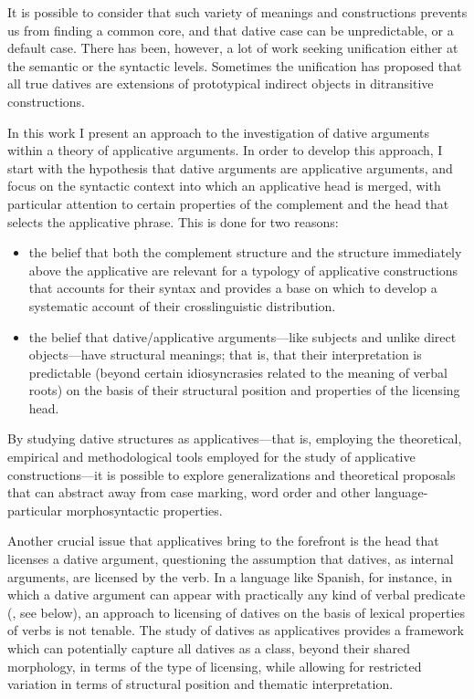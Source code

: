 \documentclass[output=paper,modfonts,nonflat]{langsci/langscibook}
\begin{document}
It is possible to consider that such variety of meanings and constructions prevents us from finding a common core, and that dative case can be unpredictable, or a default case.  There has been, however, a lot of work seeking unification either at the semantic or the syntactic levels. Sometimes the unification has proposed that all true datives are extensions of prototypical indirect objects in ditransitive constructions. 

In this work I present an approach to the investigation of dative arguments within a theory of applicative arguments. In order to develop this approach, I start with the hypothesis that dative arguments are applicative arguments, and focus on the syntactic context into which an applicative head is merged, with particular attention to certain properties of the complement and the head that selects the applicative phrase. This is done for two reasons:

\begin{itemize}
\item \begin{styleListParagraph}
the belief that both the complement structure and the structure immediately above the applicative are relevant for a typology of applicative constructions that accounts for their syntax and provides a base on which to develop a systematic account of their crosslinguistic distribution.
\end{styleListParagraph}
\item \begin{styleListParagraph}
the belief that dative/applicative arguments—like subjects and unlike direct objects—have structural meanings; that is, that their interpretation is predictable (beyond certain idiosyncrasies related to the meaning of verbal roots) on the basis of their structural position and properties of the licensing head. 
\end{styleListParagraph}
\end{itemize}

By studying dative structures as applicatives—that is, employing the theoretical, empirical and methodological tools employed for the study of applicative constructions—it is possible to explore generalizations and theoretical proposals that can abstract away from case marking, word order and other language-particular morphosyntactic properties. 

Another crucial issue that applicatives bring to the forefront is the head that licenses a dative argument, questioning the assumption that datives, as internal arguments, are licensed by the verb. In a language like Spanish, for instance, in which a dative argument can appear with practically any kind of verbal predicate (\citealt{Cuervo2003}, see  below), an approach to licensing of datives on the basis of lexical properties of verbs is not tenable. The study of datives as applicatives provides a framework which can potentially capture all datives as a class, beyond their shared morphology, in terms of the type of licensing, while allowing for restricted variation in terms of structural position and thematic interpretation. 
\end{document}
